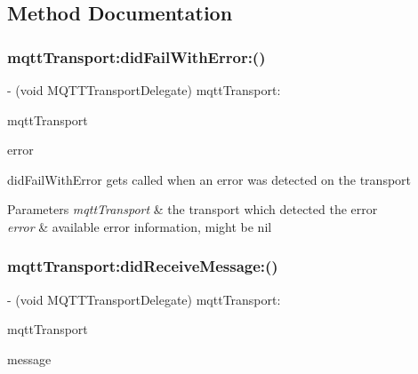 \subsection{Method Documentation}
\mbox{\label{protocol_m_q_t_t_transport_delegate_01-p_a8a3b230eddcaa652f4e132c7a970d0f1}} 
\subsubsection{\texorpdfstring{mqtt\+Transport\+:did\+Fail\+With\+Error\+:()}{mqttTransport:didFailWithError:()}}
{\footnotesize\ttfamily -\/ (void M\+Q\+T\+T\+Transport\+Delegate) mqtt\+Transport\+: \begin{DoxyParamCaption}\item[{(\+\_\+\+Nonnull id$<$ \hyperlink{interface_m_q_t_t_transport}{M\+Q\+T\+T\+Transport} $>$)}]{mqtt\+Transport }\item[{didFailWithError:(nullable N\+S\+Error $\ast$)}]{error }\end{DoxyParamCaption}\hspace{0.3cm}{\ttfamily [optional]}}

did\+Fail\+With\+Error gets called when an error was detected on the transport 
\begin{DoxyParams}{Parameters}
{\em mqtt\+Transport} & the transport which detected the error \\
\hline
{\em error} & available error information, might be nil \\
\hline
\end{DoxyParams}
\mbox{\label{protocol_m_q_t_t_transport_delegate_01-p_a19668acdd5d230dd7080a22560ce06a1}} 
\subsubsection{\texorpdfstring{mqtt\+Transport\+:did\+Receive\+Message\+:()}{mqttTransport:didReceiveMessage:()}}
{\footnotesize\ttfamily -\/ (void M\+Q\+T\+T\+Transport\+Delegate) mqtt\+Transport\+: \begin{DoxyParamCaption}\item[{(nonnull id$<$ \hyperlink{interface_m_q_t_t_transport}{M\+Q\+T\+T\+Transport} $>$)}]{mqtt\+Transport }\item[{didReceiveMessage:(nonnull N\+S\+Data $\ast$)}]{message }\end{DoxyParamCaption}}

